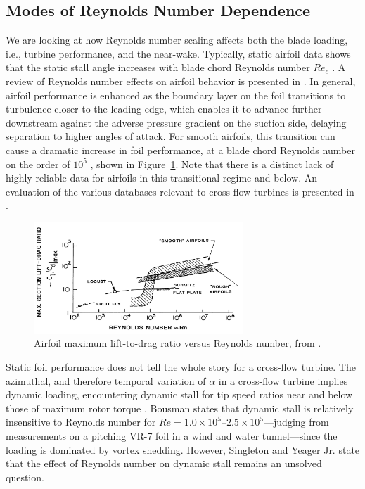 \documentclass[energies,article,accept,moreauthors,pdftex,12pt,a4paper]{mdpi}
\begin{document}
\subsection{Modes of Reynolds Number Dependence}

We are looking at how Reynolds number scaling affects both the blade loading,
i.e., turbine performance, and the near-wake. Typically, static airfoil data
shows that the static stall angle increases with blade chord Reynolds number
$Re_c$ \cite{Jacobs1937}. A review of Reynolds number effects on airfoil
behavior is presented in \cite{Lissaman1983}. In general, airfoil performance is
enhanced as the boundary layer on the foil transitions to turbulence closer to
the leading edge, which enables it to advance further downstream against the
adverse pressure gradient on the suction side, delaying separation to higher
angles of attack. For smooth airfoils, this transition can cause a dramatic
increase in foil performance, at a blade chord Reynolds number on the order of
$10^5$ \cite{McMasters1980}, shown in Figure~\ref{fig:McMasters}. Note that
there is a distinct lack of highly reliable data for airfoils in this
transitional regime and below. An evaluation of the various databases relevant
to cross-flow turbines is presented in \cite{Bedon2014}.


\begin{figure}[ht]
\centering

\includegraphics[width=0.7\textwidth]{figures/McMasters-Henderson-1980}

\caption{Airfoil maximum lift-to-drag ratio versus Reynolds number, from
    \cite{McMasters1980}.}

\label{fig:McMasters}
\end{figure}

Static foil performance does not tell the whole story for a cross-flow turbine.
The azimuthal, and therefore temporal variation of $\alpha$ in a cross-flow
turbine implies dynamic loading, encountering dynamic stall for tip speed ratios
near and below those of maximum rotor torque \cite{Para2002}. Bousman
\cite{Bousman2000-evaluation} states that dynamic stall is relatively
insensitive to Reynolds number for $Re=1.0 \times 10^5$--$2.5 \times
10^5$---judging from measurements on a pitching VR-7 foil in a wind and water
tunnel---since the loading is dominated by vortex shedding. However, Singleton
and Yeager Jr. \cite{Singleton2000} state that the effect of Reynolds number on
dynamic stall remains an unsolved question.
\end{document}
